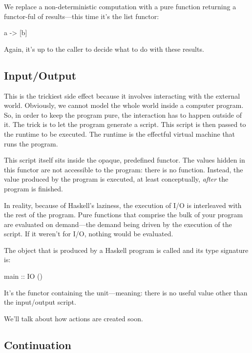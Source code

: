 \documentclass[DaoFP]{subfiles}
\begin{document}
We replace a non-deterministic computation  with a pure function returning a functor-ful of results---this time it's the list functor:
\begin{haskell}
a -> [b]
\end{haskell}
Again, it's up to the caller to decide what to do with these results.

\subsection{Input/Output}

This is the trickiest side effect because it involves interacting with the external world. Obviously, we cannot model the whole world inside a computer program. So, in order to keep the program pure, the interaction has to happen outside of it. The trick is to let the program generate a script. This script is then passed to the runtime to be executed. The runtime is the effectful virtual machine that runs the program. 

This script itself sits inside the opaque, predefined  functor. The values hidden in this functor are not accessible to the program: there is no  function. Instead, the  value produced by the program is executed, at least conceptually, \emph{after} the program is finished. 

In reality, because of Haskell's laziness, the execution of I/O is interleaved with the rest of the program.  Pure functions that comprise the bulk of your program are evaluated on demand---the demand being driven by the execution of the  script. If it weren't for I/O, nothing would be evaluated.

The  object that is produced by a Haskell program is called  and its type signature is:
\begin{haskell}
main :: IO ()
\end{haskell}
It's the  functor containing the unit---meaning: there is no useful value other than the input/output script.

We'll talk about how  actions are created soon.

\subsection{Continuation}
\end{document}
